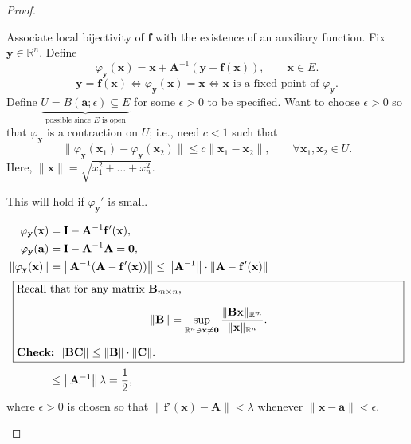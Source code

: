 \documentclass[letterpaper, reqno,11pt]{article}
\newcommand{\RR}{\mathbb{R}}
\begin{document}
\begin{proof}
\begin{enumerate}
     Associate local bijectivity of $\mathbf f$ with the existence of an auxiliary function. Fix $\mathbf y \in \RR^n$. Define
    \[ \boxed{\varphi_{\mathbf y}(\mathbf x) = \mathbf x + \mathbf A^{-1} (\mathbf y - \mathbf f(\mathbf x))}, \qquad \mathbf x \in E. \]
    \[ \mathbf y = \mathbf f(\mathbf x) \Leftrightarrow \varphi_{\mathbf y}(\mathbf x) = \mathbf x \Leftrightarrow \text{$\mathbf x$ is a fixed point of $\varphi_{\mathbf y}$}. \]
    Define $\underbrace{U = B(\mathbf a; \epsilon) \subseteq E}_\text{possible since $E$ is open}$ for some $\epsilon > 0$ to be specified. Want to choose $\epsilon > 0$ so that $\varphi_{\mathbf y}$ is a contraction on $U$; i.e., need $c < 1$ such that
    \begin{equation} \label{eq:**} \tag{**}
      \lVert \varphi_{\mathbf y}(\mathbf x_1) - \varphi_{\mathbf y}(\mathbf x_2) \rVert \leq c \lVert \mathbf x_1 - \mathbf x_2 \rVert, \qquad \forall \mathbf x_1, \mathbf x_2 \in U.
    \end{equation}
    Here, $\lVert \mathbf x \rVert = \sqrt{x_1^2 + \ldots + x_n^2}$.

     This will hold if $\varphi_{\mathbf y}'$ is small.

    \begin{align*}
      \varphi_{\mathbf y}(\mathbf x) &= \mathbf I - \mathbf A^{-1} \mathbf f'(\mathbf x), \\
      \varphi_{\mathbf y}(\mathbf a) &= \mathbf I - \mathbf A^{-1} \mathbf A = \mathbf 0, \\
      \lVert \varphi_{\mathbf y}(\mathbf x) \rVert &= \left\lVert \mathbf A^{-1} (\mathbf A - \mathbf f'(\mathbf x)) \right\rVert \leq \left\lVert \mathbf A^{-1} \right\rVert \cdot \lVert \mathbf A - \mathbf f'(\mathbf x) \rVert \\
      \intertext{
        \noindent \fbox{\begin{minipage}{\textwidth}
            Recall that for any matrix $\mathbf B_{m \times n}$,
            \[ \lVert \mathbf B \rVert = \sup_{\RR^n \ni \mathbf x \neq \mathbf 0} \frac{\lVert \mathbf B \mathbf x \rVert_{\RR^m}}{\lVert \mathbf x \rVert_{\RR^n}}. \]
            \noindent {\bf Check:} $\lVert \mathbf B \mathbf C \rVert \leq \lVert \mathbf B \rVert \cdot \lVert \mathbf C \rVert$.
      \end{minipage}}}
      &\leq \left\lVert \mathbf A^{-1} \right\rVert \lambda = \frac{1}{2},
    \end{align*}
    where $\epsilon > 0$ is chosen so that $\lVert \mathbf f'(\mathbf x) - \mathbf A \rVert < \lambda$ whenever $\lVert \mathbf x - \mathbf a \rVert < \epsilon$.


\end{enumerate}
\end{proof}
\end{document}
